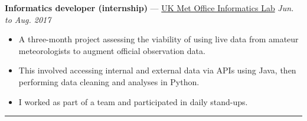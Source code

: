 \documentclass[10pt]{article}
\newenvironment{innerlist}[1][\enskip\textbullet]{
	\begin{itemize}[#1,leftmargin=*,parsep=0pt,itemsep=1pt,topsep=2pt,partopsep=0pt]
}{\end{itemize}}
\begin{document}
\textbf{Informatics developer (internship)} — \href{https://www.metoffice.gov.uk/research/foundation/informatics-lab/what-we-do}{UK Met Office Informatics Lab} \hfill \emph{Jun. to Aug. 2017} \\
\vspace{-6pt}
\begin{innerlist}
	\item A three-month project assessing the viability of using live data from amateur meteorologists to augment official observation data. 
	\item This involved accessing internal and external data via APIs using Java, then performing data cleaning and analyses in Python.
	\item I worked as part of a team and participated in daily stand-ups.
\end{innerlist} 







\vspace{1pt}
\begin{center}
		\rule{0.5\columnwidth}{1pt}
\end{center}
\vspace{-10pt}

\end{document}
